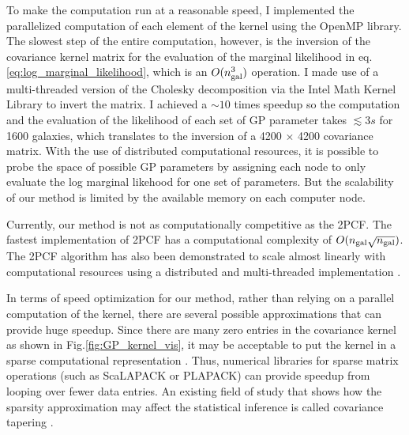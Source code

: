 To make the computation run at a reasonable speed, 
I implemented the parallelized computation of each element of the kernel using 
the {\sc OpenMP} library. The slowest step of the entire computation, however, 
is the inversion of the
covariance kernel matrix for the evaluation of the marginal likelihood in eq.
\ref{eq:log_marginal_likelihood}, 
which is an $O(n_{\rm gal}^3)$ operation. 
I made use of a multi-threaded version of the Cholesky decomposition via the {\sc Intel Math
Kernel Library} to invert the matrix. I achieved a $\sim10$ 
times speedup so the computation and the evaluation of the likelihood of each set of GP parameter
takes $\lesssim 3s$ for 1600 galaxies, which translates to 
the inversion of a 4200 $\times$ 4200 covariance matrix.
With the use of distributed computational resources, it is possible 
to probe the space of possible GP parameters by assigning each node to only
evaluate the log marginal likehood for one set of parameters. 
But the scalability of our method is limited by the available memory on each
computer node.

Currently, our method is not as computationally competitive as the 2PCF. 
The fastest implementation of 2PCF has a computational complexity of
$O(n_{\rm gal}\sqrt{n_{\rm gal}})$.
The 2PCF algorithm has also been demonstrated to scale almost linearly with
computational resources 
using a distributed and multi-threaded implementation \citep{Chhugani2012}. 

In terms of speed optimization for our method, rather than relying on 
a parallel computation of the kernel, there are several 
possible approximations that can provide huge speedup. 
Since there are many zero entries in the covariance kernel as shown in
Fig.\ref{fig:GP_kernel_vis}, it may be acceptable to put the kernel in a sparse
computational representation \citep{Snelson2007}. 
Thus, numerical libraries for sparse matrix 
operations (such as {\sc ScaLAPACK} or {\sc PLAPACK})
can provide speedup from looping over fewer data entries. 
An existing field of study that shows how the sparsity
approximation may affect the statistical inference is called covariance
tapering \citep{Kaufman2005}. 

